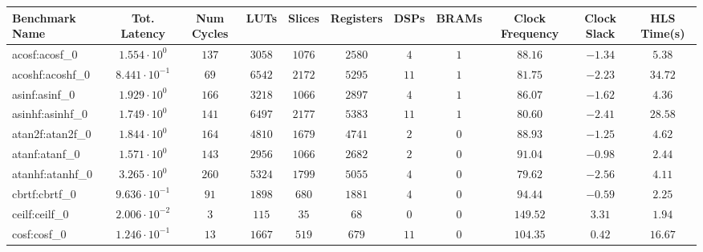 \begin{tabular}{|l|c|c|c|c|c|c|c|c|c|c|}
\hline
Benchmark Name               & Tot. Latency            & Num Cycles & LUTs       & Slices    & Registers & DSPs    & BRAMs & Clock Frequency & Clock Slack & HLS Time(s) \\
\hline
acosf:acosf\_0               & $ 1.554 \cdot 10^{0}  $ & $ 137    $ & $ 3058   $ & $ 1076  $ & $ 2580  $ & $ 4   $ & $ 1 $ & $ 88.16       $ & $ -1.34   $ & $ 5.38    $ \\
acoshf:acoshf\_0             & $ 8.441 \cdot 10^{-1} $ & $ 69     $ & $ 6542   $ & $ 2172  $ & $ 5295  $ & $ 11  $ & $ 1 $ & $ 81.75       $ & $ -2.23   $ & $ 34.72   $ \\
asinf:asinf\_0               & $ 1.929 \cdot 10^{0}  $ & $ 166    $ & $ 3218   $ & $ 1066  $ & $ 2897  $ & $ 4   $ & $ 1 $ & $ 86.07       $ & $ -1.62   $ & $ 4.36    $ \\
asinhf:asinhf\_0             & $ 1.749 \cdot 10^{0}  $ & $ 141    $ & $ 6497   $ & $ 2177  $ & $ 5383  $ & $ 11  $ & $ 1 $ & $ 80.60       $ & $ -2.41   $ & $ 28.58   $ \\
atan2f:atan2f\_0             & $ 1.844 \cdot 10^{0}  $ & $ 164    $ & $ 4810   $ & $ 1679  $ & $ 4741  $ & $ 2   $ & $ 0 $ & $ 88.93       $ & $ -1.25   $ & $ 4.62    $ \\
atanf:atanf\_0               & $ 1.571 \cdot 10^{0}  $ & $ 143    $ & $ 2956   $ & $ 1066  $ & $ 2682  $ & $ 2   $ & $ 0 $ & $ 91.04       $ & $ -0.98   $ & $ 2.44    $ \\
atanhf:atanhf\_0             & $ 3.265 \cdot 10^{0}  $ & $ 260    $ & $ 5324   $ & $ 1799  $ & $ 5055  $ & $ 4   $ & $ 0 $ & $ 79.62       $ & $ -2.56   $ & $ 4.11    $ \\
cbrtf:cbrtf\_0               & $ 9.636 \cdot 10^{-1} $ & $ 91     $ & $ 1898   $ & $ 680   $ & $ 1881  $ & $ 4   $ & $ 0 $ & $ 94.44       $ & $ -0.59   $ & $ 2.25    $ \\
ceilf:ceilf\_0               & $ 2.006 \cdot 10^{-2} $ & $ 3      $ & $ 115    $ & $ 35    $ & $ 68    $ & $ 0   $ & $ 0 $ & $ 149.52      $ & $ 3.31    $ & $ 1.94    $ \\
cosf:cosf\_0                 & $ 1.246 \cdot 10^{-1} $ & $ 13     $ & $ 1667   $ & $ 519   $ & $ 679   $ & $ 11  $ & $ 0 $ & $ 104.35      $ & $ 0.42    $ & $ 16.67   $ \\

\end{tabular}
